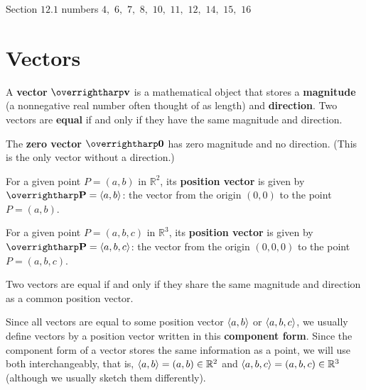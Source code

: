 \documentclass[letterpaper, twoside, 12pt]{book}
\begin{document}
\begin{suggestedHW}
Section $12.1$ numbers $4,$ $6,$ $7,$ $8,$ $10,$ $11,$ $12,$ $14,$ $15,$ $16$
\end{suggestedHW}



\section{Vectors}

\begin{definition}
  A \textbf{vector} $\harpvec v$ is a mathematical object that stores a
  \textbf{magnitude} (a nonnegative real number often thought of as length)
  and \textbf{direction}. Two vectors are \textbf{equal} if and only if they
  have the same magnitude and direction.
\end{definition}

\begin{definition}
  The \textbf{zero vector} $\harpvec0$ has zero magnitude and no direction.
  (This is the only vector without a direction.)
\end{definition}

\begin{definition}
  For a given point $P=(a,b)$ in $\mathbb{R}^2$, its \textbf{position vector}
  is given by $\harpvec{P}=\<a,b\>$: the vector from the origin $(0,0)$ to the
  point $P=(a,b)$.

  For a given point $P=(a,b,c)$ in $\mathbb{R}^3$, its \textbf{position vector}
  is given by $\harpvec{P}=\<a,b,c\>$: the vector from the origin $(0,0,0)$ to
  the point $P=(a,b,c)$.
\end{definition}

\begin{theorem}
  Two vectors are equal if and only if they share the same magnitude and
  direction as a common position vector.
\end{theorem}

\begin{definition}
  Since all vectors are equal to some position vector $\langle a,b\rangle$ or $\langle a,b,c\rangle$,
  we usually define vectors by a position vector written in this
  \textbf{component form}.
  Since the component form of a vector stores the same information as a point,
  we will use both interchangeably, that is, $\langle a,b\rangle=(a,b)\in\mathbb{R}^2$ and
  $\langle a,b,c\rangle=(a,b,c)\in\mathbb{R}^3$
  (although we usually sketch them differently).
\end{definition}
\end{document}
